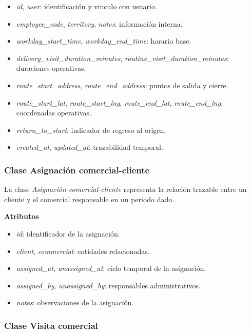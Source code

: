 \begin{itemize}
      \item \textit{id}, \textit{user}: identificación y vinculo con usuario.
      \item \textit{employee\_code}, \textit{territory}, \textit{notes}: información interna.
      \item \textit{workday\_start\_time}, \textit{workday\_end\_time}: horario base.
      \item \textit{delivery\_visit\_duration\_minutes}, \textit{routine\_visit\_duration\_minutes}: duraciones operativas.
      \item \textit{route\_start\_address}, \textit{route\_end\_address}: puntos de salida y cierre.
      \item \textit{route\_start\_lat}, \textit{route\_start\_lng}, \textit{route\_end\_lat}, \textit{route\_end\_lng}: coordenadas operativas.
      \item \textit{return\_to\_start}: indicador de regreso al origen.
      \item \textit{created\_at}, \textit{updated\_at}: trazabilidad temporal.
\end{itemize}

\subsubsection{Clase Asignación comercial-cliente}

La clase \textit{Asignación comercial-cliente} representa la relación trazable entre un cliente y el comercial responsable en un periodo dado.

\textbf{Atributos}

\begin{itemize}
      \item \textit{id}: identificador de la asignación.
      \item \textit{client}, \textit{commercial}: entidades relacionadas.
      \item \textit{assigned\_at}, \textit{unassigned\_at}: ciclo temporal de la asignación.
      \item \textit{assigned\_by}, \textit{unassigned\_by}: responsables administrativos.
      \item \textit{notes}: observaciones de la asignación.
\end{itemize}

\subsubsection{Clase Visita comercial}

